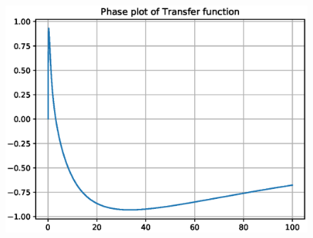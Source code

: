 \begin{enumerate}[label=\thesection.\arabic*.,ref=\thesection.\theenumi]
\begin{figure}[!ht]
\centering
\includegraphics[width=\columnwidth]{./figs/EE18BTECH11044.eps}
\caption{}
\label{fig:ee18btech11044}
\end{figure}


\end{enumerate}
